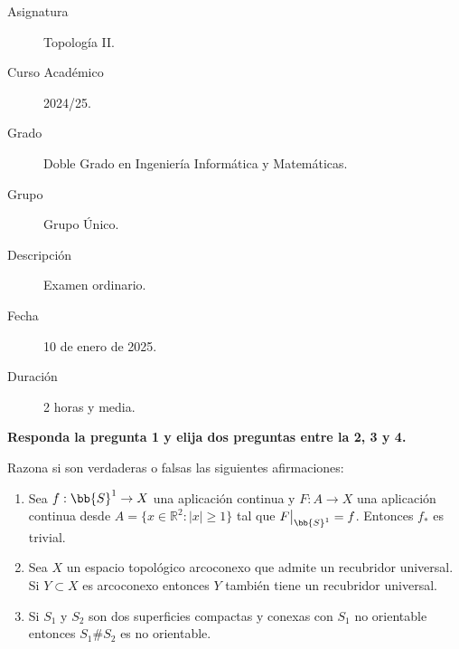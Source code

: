 \documentclass[12pt]{article}
\begin{document}

    
    

    \begin{description}
        \item[Asignatura] Topología II.
        \item[Curso Académico] 2024/25.
        \item[Grado] Doble Grado en Ingeniería Informática y Matemáticas.
        \item[Grupo] Grupo Único.
        \item[Descripción] Examen ordinario.
        \item[Fecha] 10 de enero de 2025.
        \item[Duración] 2 horas y media.
    \end{description}
    \newpage


    
    \noindent
    \textbf{Responda la pregunta 1 y elija dos preguntas entre la 2, 3 y 4.}

    \begin{ejercicio}
        Razona si son verdaderas o falsas las siguientes afirmaciones:
        \begin{enumerate}[label=\alph*)]
            \item Sea $f:\bb{S}^1\to X$ una aplicación continua y $F:A\to X$ una aplicación continua desde $A=\{x\in \mathbb{R}^2 : |x|\geq 1\}$ tal que $F\big|_{\bb{S}^1} = f$. Entonces $f_\ast$ es trivial.
            \item Sea $X$ un espacio topológico arcoconexo que admite un recubridor universal. Si $Y\subset X$ es arcoconexo entonces $Y$ también tiene un recubridor universal.
            \item Si $S_1$ y $S_2$ son dos superficies compactas y conexas con $S_1$ no orientable entonces $S_1\#S_2$ es no orientable.
        \end{enumerate}
    \end{ejercicio}
\end{document}
